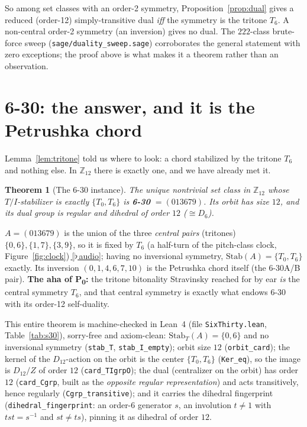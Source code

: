 \documentclass[11pt]{article}
\newtheorem{theorem}{Theorem}
\newcommand{\lean}[1]{\texttt{#1}}
\newcommand{\Ztwelve}{\mathbb{Z}_{12}}
\newcommand{\Dgrp}[1]{D_{#1}}
\newcommand{\Stab}{\mathrm{Stab}}
\newcommand{\audiobase}{https://github.com/karlesmarin/music-math/raw/main/media}
\newcommand{\audio}[1]{\href{\audiobase/#1}{\textcolor{ctA}{\footnotesize\,[$\flat$\,audio]}}}
\begin{document}
So among set classes with an order-2 symmetry, Proposition~\ref{prop:dual} gives a reduced (order-12)
simply-transitive dual \emph{iff} the symmetry is the tritone $T_6$. A non-central order-2 symmetry (an
inversion) gives no dual. The $222$-class brute-force sweep (\lean{sage/duality\_sweep.sage}) corroborates
the general statement with zero exceptions; the proof above is what makes it a theorem rather than an
observation.

\section{6-30: the answer, and it is the Petrushka chord}\label{sec:sixthirty}

Lemma~\ref{lem:tritone} told us where to look: a chord stabilized by the tritone $T_6$ and nothing else.
In $\Ztwelve$ there is exactly one, and we have already met it.

\begin{theorem}[The 6-30 instance]\label{thm:sixthirty}
The unique nontrivial set class in $\Ztwelve$ whose $T/I$-stabilizer is exactly $\{T_0,T_6\}$ is
\textbf{6-30} $=(013679)$. Its orbit has size $12$, and its dual group is regular and dihedral of order
$12$ ($\cong\Dgrp{6}$).
\end{theorem}

$A=(013679)$ is the union of the three \emph{central pairs} (tritones) $\{0,6\},\{1,7\},\{3,9\}$, so it
is fixed by $T_6$ (a half-turn of the pitch-class clock, Figure~\ref{fig:clock})\,\audio{t6_symmetry.wav};
having no inversional symmetry, $\Stab(A)=\{T_0,T_6\}$ exactly. Its inversion $(0,1,4,6,7,10)$ is the Petrushka chord itself
(the $6$-30A/B pair). \textbf{The aha of P\textsubscript{0}:} the tritone bitonality Stravinsky reached
for by ear \emph{is} the central symmetry $T_6$, and that central symmetry is exactly what endows 6-30
with its order-12 self-duality.

This entire theorem is machine-checked in Lean~4 (file \lean{SixThirty.lean}, Table~\ref{tab:s30}),
sorry-free and axiom-clean: $\Stab_T(A)=\{0,6\}$ and no inversional symmetry (\lean{stab\_T},
\lean{stab\_I\_empty}); orbit size $12$ (\lean{orbit\_card}); the kernel of the $\Dgrp{12}$-action on the
orbit is the center $\{T_0,T_6\}$ (\lean{Ker\_eq}), so the image is $\Dgrp{12}/Z$ of order $12$
(\lean{card\_TIgrpO}); the dual (centralizer on the orbit) has order $12$ (\lean{card\_Cgrp}, built as the
\emph{opposite regular representation}) and acts transitively, hence regularly (\lean{Cgrp\_transitive});
and it carries the dihedral fingerprint (\lean{dihedral\_fingerprint}: an order-$6$ generator $s$, an
involution $t\ne1$ with $tst=s^{-1}$ and $st\ne ts$), pinning it as dihedral of order $12$.
\end{document}
